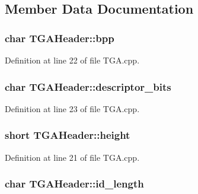 \subsection{Member Data Documentation}
\hypertarget{struct_t_g_a_header_a32a4bc2d8730d0cdf7659cd8c49bd83f}{
\subsubsection[{bpp}]{\setlength{\rightskip}{0pt plus 5cm}char T\+G\+A\+Header\+::bpp}}\label{struct_t_g_a_header_a32a4bc2d8730d0cdf7659cd8c49bd83f}


Definition at line 22 of file T\+G\+A.\+cpp.

\hypertarget{struct_t_g_a_header_ab85bf0dd4e2ae87f173c301348be6220}{
\subsubsection[{descriptor\+\_\+bits}]{\setlength{\rightskip}{0pt plus 5cm}char T\+G\+A\+Header\+::descriptor\+\_\+bits}}\label{struct_t_g_a_header_ab85bf0dd4e2ae87f173c301348be6220}


Definition at line 23 of file T\+G\+A.\+cpp.

\hypertarget{struct_t_g_a_header_afd860454068cafca5048f9a9b0c3edc5}{
\subsubsection[{height}]{\setlength{\rightskip}{0pt plus 5cm}short T\+G\+A\+Header\+::height}}\label{struct_t_g_a_header_afd860454068cafca5048f9a9b0c3edc5}


Definition at line 21 of file T\+G\+A.\+cpp.

\hypertarget{struct_t_g_a_header_aa8452ce11ec3d3f59459dd2c2a799709}{
\subsubsection[{id\+\_\+length}]{\setlength{\rightskip}{0pt plus 5cm}char T\+G\+A\+Header\+::id\+\_\+length}}\label{struct_t_g_a_header_aa8452ce11ec3d3f59459dd2c2a799709}


